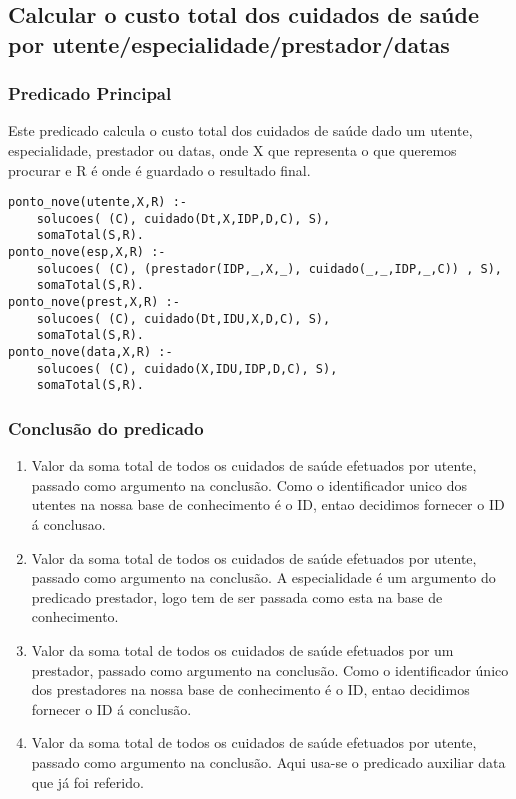 \documentclass[a4paper]{report} %
\begin{document}
\subsection{ Calcular o custo total dos cuidados de saúde por utente/especialidade/prestador/datas}

\subsubsection{Predicado Principal}
Este predicado calcula o custo total dos cuidados de saúde dado um  utente, especialidade, prestador ou datas, onde X que representa o que queremos procurar e R é onde é guardado o resultado final.

\begin{verbatim}
ponto_nove(utente,X,R) :- 
    solucoes( (C), cuidado(Dt,X,IDP,D,C), S), 
    somaTotal(S,R).
ponto_nove(esp,X,R) :- 
    solucoes( (C), (prestador(IDP,_,X,_), cuidado(_,_,IDP,_,C)) , S), 
    somaTotal(S,R).
ponto_nove(prest,X,R) :- 
    solucoes( (C), cuidado(Dt,IDU,X,D,C), S), 
    somaTotal(S,R). 
ponto_nove(data,X,R) :- 
    solucoes( (C), cuidado(X,IDU,IDP,D,C), S), 
    somaTotal(S,R).
\end{verbatim}

\subsubsection{Conclusão do predicado} 
\begin{enumerate}
\item Valor da soma total de todos os cuidados de saúde efetuados por utente, passado como argumento na conclusão. Como o identificador unico dos utentes na nossa base de conhecimento é o ID, entao decidimos fornecer o ID á conclusao.
\item Valor da soma total de todos os cuidados de saúde efetuados por utente, passado como argumento na conclusão. A especialidade é um argumento do predicado prestador, logo tem de ser passada como esta na base de conhecimento.
\item  Valor da soma total de todos os cuidados de saúde efetuados por um prestador, passado como argumento na conclusão. Como o identificador único dos prestadores na nossa base de conhecimento é o ID, entao decidimos fornecer o ID á conclusão.
\item Valor da soma total de todos os cuidados de saúde efetuados por utente, passado como argumento na conclusão. Aqui usa-se o predicado auxiliar data que já foi referido.
\end{enumerate}    
\end{document}
